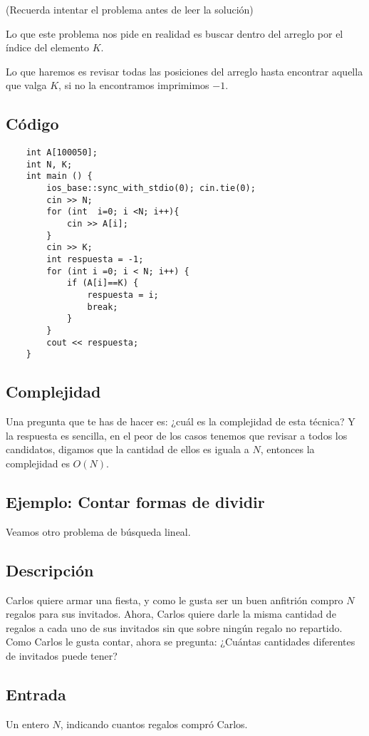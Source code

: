(Recuerda intentar el problema antes de leer la solución)

Lo que este problema nos pide en realidad es buscar dentro del arreglo por el índice del elemento \(K\).

Lo que haremos es revisar todas las posiciones del arreglo hasta encontrar aquella que valga \(K\), si no la encontramos imprimimos \(-1\).


\subsection*{Código}
\begin{lstlisting}
	int A[100050];
	int N, K;
	int main () {	
		ios_base::sync_with_stdio(0); cin.tie(0);
		cin >> N;
		for (int  i=0; i <N; i++){ 
			cin >> A[i];
		}
		cin >> K;
		int respuesta = -1;
		for (int i =0; i < N; i++) {
			if (A[i]==K) {
				respuesta = i;
				break;
			}
		}
		cout << respuesta;
	}
\end{lstlisting}


\subsection{Complejidad}

Una pregunta que te has de hacer es: ¿cuál es la complejidad de esta técnica? Y la respuesta es sencilla, en el peor de los casos tenemos que revisar a todos los candidatos, digamos que la cantidad de ellos es iguala a \(N\), entonces la complejidad es \(O(N)\).

\subsection{Ejemplo: Contar formas de dividir}
Veamos otro problema de búsqueda lineal. 

\subsection*{Descripción}

Carlos quiere armar una fiesta, y como le gusta ser un buen anfitrión compro \(N\) regalos para sus invitados.
Ahora, Carlos quiere darle la misma cantidad de regalos a cada uno de sus invitados sin que sobre ningún regalo no repartido. Como Carlos le gusta contar, ahora se pregunta: ¿Cuántas cantidades diferentes de invitados puede tener?
\subsection*{Entrada}
Un entero \(N\), indicando cuantos regalos compró Carlos.
